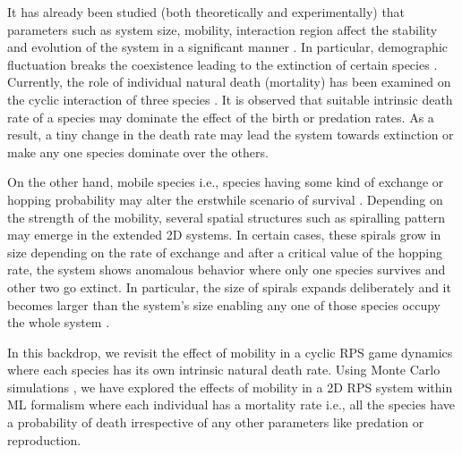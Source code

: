 \documentclass[aps, pre, twocolumn, amsmath, superscriptaddress,showkeys,showpacs]{revtex4-1}
\begin{document}
	 \par It has already been studied ({both theoretically and experimentally}) that parameters such as system size, mobility, interaction region affect the stability and evolution of the system in a significant manner \cite{kerr2002local,pennisi2005determines,frey2010evolutionary,muller2010community}. In particular, demographic fluctuation breaks the coexistence leading to the extinction of certain species \cite{reichenbach2006coexistence,serrao2021rare,west2020fixation,berr2009zero}. Currently, {the role of individual natural death (mortality) has been examined on the cyclic interaction of three species \cite{bhattacharyya2020mortality}.} It is observed that suitable intrinsic death rate of a species may dominate the effect of the birth or predation rates. As a result, a tiny change in the death rate may lead the system towards extinction or make any one species dominate over the others. 
	\par On the other hand, mobile species i.e., species having some kind of exchange or hopping probability may {alter the erstwhile scenario of survival} \cite{kerr2002local,reichenbach2008self,kirkup2004antibiotic}. Depending on the strength of the mobility, several spatial structures such as { spiralling} pattern \cite{ reichenbach2008self,avelino2012junctions, avelino2018directional} may emerge in the  extended 2D systems. In certain cases, these spirals grow in size depending on the rate of exchange and after a critical value of the hopping rate, the system shows anomalous behavior where only one species survives and other two go extinct. In particular, the size of spirals expands deliberately and it becomes larger than the system's size enabling any one of those species occupy the whole system \cite{reichenbach2007mobility}.
	\par In this backdrop, we revisit the effect of mobility in a cyclic RPS game dynamics where each species has its own intrinsic natural death rate. Using Monte Carlo simulations \cite{mooney1997monte, zio2013monte, szabo2007evolutionary}, we have explored the effects of mobility in a 2D RPS system within ML formalism where {each individual has a mortality rate i.e., all the species have a probability of death} irrespective of any other parameters like predation or reproduction. %
\end{document}
